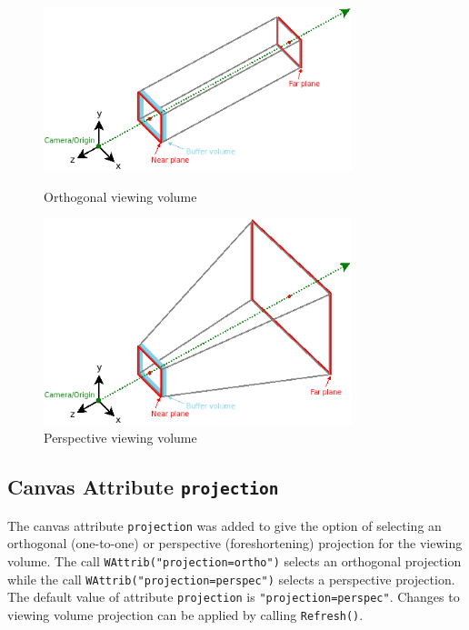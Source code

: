 \documentclass[letterpaper,12pt]{article}
\begin{document}
\begin{figure}[h!]
  \centering
  \begin{minipage}{0.45\textwidth}
    \centering
    \includegraphics[width=0.8\textwidth]{viewingvolume-orthogonal.png}
    \caption{Orthogonal viewing volume}
  \end{minipage}\hfill
  \begin{minipage}{0.45\textwidth}
    \centering
    \includegraphics[width=0.8\textwidth]{viewingvolume-perspective.png}
    \caption{Perspective viewing volume}
  \end{minipage}\hfill
\end{figure}

\subsection{Canvas Attribute \texttt{projection}}

The canvas attribute \texttt{projection} was added to give the option of
selecting an orthogonal (one-to-one) or perspective (foreshortening) projection 
for the viewing volume. The call
\texttt{WAttrib("projection=ortho")} selects an orthogonal projection while
the call \texttt{WAttrib("projection=perspec")} selects a perspective
projection. The default value of attribute \texttt{projection} is
\texttt{"projection=perspec"}. Changes to viewing volume
projection can be applied by calling \texttt{Refresh()}.
\end{document}
